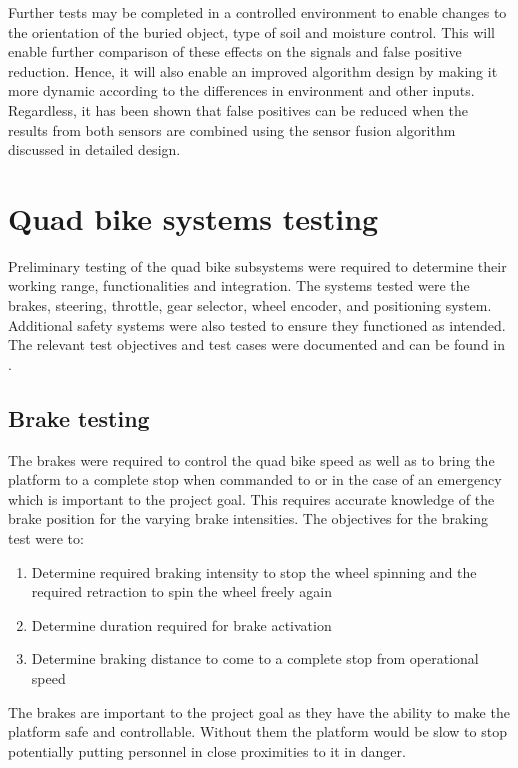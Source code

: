 \documentclass[main.tex]{subfiles}
\begin{document}
Further tests may be completed in a controlled environment to enable changes to the orientation of the buried object, type of soil and moisture control. This will enable further comparison of these effects on the signals and false positive reduction. Hence, it will also enable an improved algorithm design by making it more dynamic according to the differences in environment and other inputs. Regardless, it has been shown that false positives can be reduced when the results from both sensors are combined using the sensor fusion algorithm discussed in detailed design.

\section{Quad bike systems testing}
Preliminary testing of the quad bike subsystems were required to determine their working range, functionalities and integration. The systems tested were the brakes, steering, throttle, gear selector, wheel encoder, and positioning system. Additional safety systems were also tested to ensure they functioned as intended.
The relevant test objectives and test cases were documented and can be found in .

\subsection{Brake testing}
The brakes were required to control the quad bike speed as well as to bring the platform to a complete stop when commanded to or in the case of an emergency which is important to the project goal. This requires accurate knowledge of the brake position for the varying brake intensities. The objectives for the braking test were to:

\begin{enumerate}
\item Determine required braking intensity to stop the wheel spinning and the required retraction to spin the wheel freely again
\item Determine duration required for brake activation
\item Determine braking distance to come to a complete stop from operational speed  
\end{enumerate}

The brakes are important to the project goal as they have the ability to make the platform safe and controllable. Without them the platform would be slow to stop potentially putting personnel in close proximities to it in danger.
\end{document}
